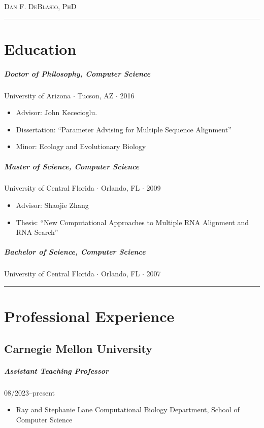 \documentclass[10pt,letterpaper]{article}
\newcommand{\bigdot}{$\cdot$\xspace}
\newcommand{\namestyle}{\Huge \scshape}
\newcommand{\cvsection}[1]{%
    \par\vspace{10pt}%
  \noindent\rule{\linewidth}{0.4pt}\par
  \vspace{-5.5ex}%
  \section*{#1}%
}
\begin{document}
\hspace{-2.5em}
{\noindent\namestyle Dan F. DeBlasio, PhD}\hfill
{}

\small

\cvsection{Education}

\subparagraph{Doctor of Philosophy, Computer Science}
University of Arizona \bigdot Tucson, AZ \bigdot 2016
\begin{itemize}
    \item Advisor: John Kececioglu.
    \item Dissertation: ``Parameter Advising for Multiple Sequence Alignment''
    \item Minor: Ecology and Evolutionary Biology
\end{itemize}

\subparagraph{Master of Science, Computer Science}
University of Central Florida \bigdot Orlando, FL \bigdot 2009
\begin{itemize}
   \item Advisor: Shaojie Zhang
    \item Thesis: ``New Computational Approaches to Multiple RNA Alignment and RNA Search''
\end{itemize}

\subparagraph{Bachelor of Science, Computer Science}
University of Central Florida \bigdot Orlando, FL \bigdot 2007

\cvsection{Professional Experience}

\subsection*{Carnegie Mellon University}
\vspace{-.75em}
\subparagraph{Assistant Teaching Professor} 08/2023--present
\begin{itemize}
    \item Ray and Stephanie Lane Computational Biology Department, School of Computer Science
\end{itemize}\vspace{-1em}
\end{document}
